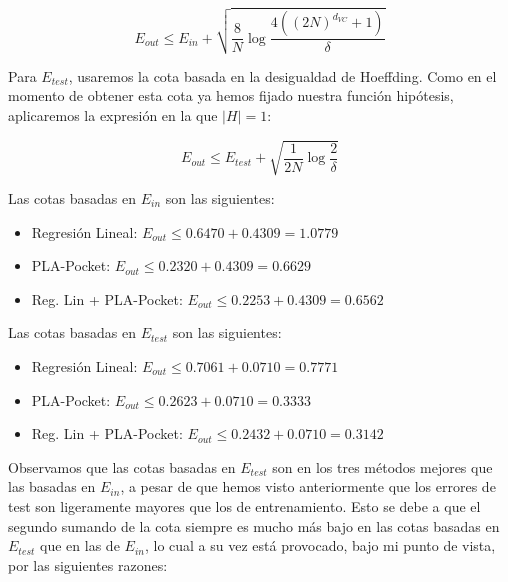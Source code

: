 \documentclass[10pt,a4paper]{article}
\begin{document}
$$E_{out} \leq E_{in} + \sqrt{\frac{8}{N}\log{\frac{4((2N)^{d_{VC}}+1)}{\delta}}}$$



Para $E_{test}$, usaremos la cota basada en la desigualdad de Hoeffding. Como en el momento de obtener esta cota ya hemos fijado nuestra función hipótesis, aplicaremos la expresión en la que $|H| = 1$:

$$E_{out} \leq E_{test} + \sqrt{\frac{1}{2N}\log{\frac{2}{\delta}}}$$

Las cotas basadas en $E_{in}$ son las siguientes:

\begin{itemize}
	\item Regresión Lineal: $E_{out} \leq 0.6470 + 0.4309 = 1.0779$
	\item PLA-Pocket: $E_{out} \leq 0.2320 + 0.4309 = 0.6629$
	\item Reg. Lin + PLA-Pocket: $E_{out} \leq 0.2253 + 0.4309 = 0.6562$
\end{itemize}

Las cotas basadas en $E_{test}$ son las siguientes:

\begin{itemize}
\item Regresión Lineal: $E_{out} \leq 0.7061 + 0.0710 = 0.7771$
\item PLA-Pocket: $E_{out} \leq 0.2623 + 0.0710 = 0.3333$
\item Reg. Lin + PLA-Pocket: $E_{out} \leq 0.2432 + 0.0710 = 0.3142$
\end{itemize}

Observamos que las cotas basadas en $E_{test}$ son en los tres métodos mejores que las basadas en $E_{in}$, a pesar de que hemos visto anteriormente que los errores de test son ligeramente mayores que los de entrenamiento. Esto se debe a que el segundo sumando de la cota siempre es mucho más bajo en las cotas basadas en $E_{test}$ que en las de $E_{in}$, lo cual a su vez está provocado, bajo mi punto de vista, por las siguientes razones:
\end{document}
